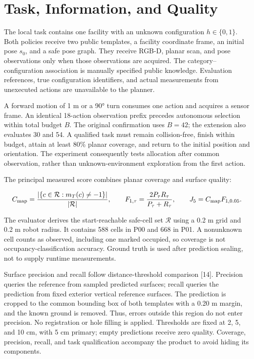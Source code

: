 \documentclass[11pt,a4paper]{article}
\begin{document}
\hypertarget{task-information-and-quality}{%
\section{Task, Information, and Quality}\label{task-information-and-quality}}

The local task contains one facility with an unknown configuration \(h\in\{0,1\}\). Both policies receive two public templates, a facility coordinate frame, an initial pose \(s_0\), and a safe pose graph. They receive RGB-D, planar scan, and pose observations only when those observations are acquired. The category--configuration association is manually specified public knowledge. Evaluation references, true configuration identifiers, and actual measurements from unexecuted actions are unavailable to the planner.

A forward motion of 1 m or a 90° turn consumes one action and acquires a sensor frame. An identical 18-action observation prefix precedes autonomous selection within total budget \(B\). The original confirmation uses \(B=42\); the extension also evaluates 30 and 54. A qualified task must remain collision-free, finish within budget, attain at least 80\% planar coverage, and return to the initial position and orientation. The experiment consequently tests allocation after common observation, rather than unknown-environment exploration from the first action.

The principal measured score combines planar coverage and surface quality:

\[
C_{\rm map}=\frac{|\{c\in\mathcal R:m_T(c)\ne-1\}|}{|\mathcal R|},
\qquad F_{1,\tau}=\frac{2P_\tau R_\tau}{P_\tau+R_\tau},
\qquad J_5=C_{\rm map}F_{1,0.05}.
\]

The evaluator derives the start-reachable safe-cell set \(\mathcal R\) using a 0.2 m grid and 0.2 m robot radius. It contains 588 cells in P00 and 668 in P01. A nonunknown cell counts as observed, including one marked occupied, so coverage is not occupancy-classification accuracy. Ground truth is used after prediction sealing, not to supply runtime measurements.

Surface precision and recall follow distance-threshold comparison {[}14{]}. Precision queries the reference from sampled predicted surfaces; recall queries the prediction from fixed exterior vertical reference surfaces. The prediction is cropped to the common bounding box of both templates with a 0.20 m margin, and the known ground is removed. Thus, errors outside this region do not enter precision. No registration or hole filling is applied. Thresholds are fixed at 2, 5, and 10 cm, with 5 cm primary; empty predictions receive zero quality. Coverage, precision, recall, and task qualification accompany the product to avoid hiding its components.
\end{document}
